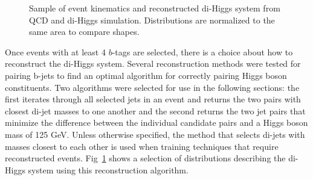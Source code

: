 \begin{figure}[ht!]
\begin{center}
  \caption{Sample of event kinematics and reconstructed di-Higgs system from QCD and di-Higgs simulation. Distributions are normalized to the same area to compare shapes.}
  \label{fig:jetInfo}
  \end{center}
\end{figure}

Once events with at least 4 $b$-tags are selected, there is a choice about how to reconstruct the di-Higgs system. Several reconstruction methods were tested for pairing b-jets to find an optimal algorithm for correctly pairing Higgs boson constituents. Two algorithms were selected for use in the following sections: the first iterates through all selected jets in an event and returns the two pairs with closest di-jet masses to one another and the second returns the two jet pairs that minimize the difference between the individual candidate pairs and a Higgs boson mass of 125 GeV. Unless otherwise specified, the method that selects di-jets with masses closest to each other is used when training techniques that require reconstructed events. Fig~\ref{fig:jetInfo} shows a selection of distributions describing the di-Higgs system using this reconstruction algorithm.%



